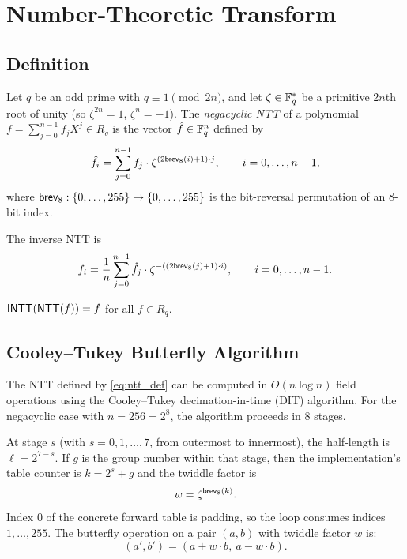 \section{Number-Theoretic Transform}

\subsection{Definition}

Let $q$ be an odd prime with $q \equiv 1 \pmod{2n}$, and let $\zeta \in \mathbb{F}_q^*$
be a primitive $2n$th root of unity (so $\zeta^{2n} = 1$, $\zeta^n = -1$).
The \emph{negacyclic NTT} of a polynomial $f = \sum_{j=0}^{n-1} f_j X^j \in
R_q$ is the vector $\hat{f} \in \mathbb{F}_q^n$ defined by
\begin{equation}
  \hat{f}_i = \sum_{j=0}^{n-1} f_j \cdot \zeta^{(2\mathsf{brev}_8(i)+1) \cdot j},
  \qquad i = 0, \dots, n-1,
\label{eq:ntt_def}
\end{equation}
where $\mathsf{brev}_8 : \{0,\dots,255\} \to \{0,\dots,255\}$ is the bit-reversal
permutation of an 8-bit index.

The inverse NTT is
\begin{equation}
  f_i = \frac{1}{n} \sum_{j=0}^{n-1} \hat{f}_j \cdot \zeta^{-((2\mathsf{brev}_8(j)+1) \cdot i)},
  \qquad i = 0, \dots, n-1.
\label{eq:intt_def}
\end{equation}

\begin{proposition}
  $\mathsf{INTT}(\mathsf{NTT}(f)) = f$ for all $f \in R_q$.
\label{prop:roundtrip}
\end{proposition}

\subsection{Cooley--Tukey Butterfly Algorithm}
\label{sec:ct_butterfly}

The NTT defined by \cref{eq:ntt_def} can be computed in $O(n \log n)$ field
operations using the Cooley--Tukey decimation-in-time (DIT) algorithm.  For
the negacyclic case with $n = 256 = 2^8$, the algorithm proceeds in 8 stages.

At stage $s$ (with $s = 0, 1, \dots, 7$, from outermost to innermost), the
half-length is $\ell = 2^{7-s}$.  If $g$ is the group number within that
stage, then the implementation's table counter is $k = 2^s + g$ and the
twiddle factor is
\[
  w = \zeta^{\mathsf{brev}_8(k)}.
\]
Index 0 of the concrete forward table is padding, so the loop consumes
indices $1,\dots,255$.  The butterfly operation on a pair $(a, b)$ with
twiddle factor $w$ is:
\begin{equation}
  (a', b') = (a + w \cdot b,\ a - w \cdot b).
\label{eq:butterfly}
\end{equation}

